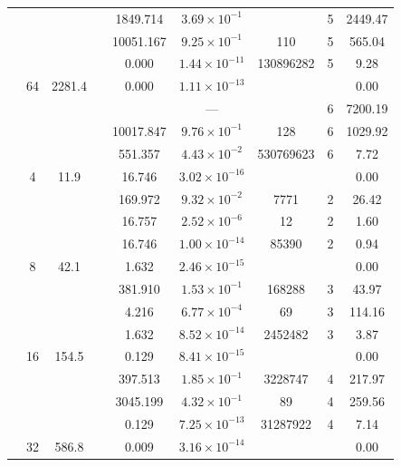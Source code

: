 \begin{table}[htbp]
\begin{tabular}{l S[table-format=3.0] S[table-format=4.1] l S[table-format=3.3] S[table-format=1.2e2] S[table-format=6.0] S[table-format=2.0] S[table-format=4.2]}
     &  &  &  & 1849.714 & $3.69 \times 10^{-1}$ & {\text{---}} & 5 & 2449.47 \\
     &  &  &  & 10051.167 & $9.25 \times 10^{-1}$ & 110 & 5 & 565.04 \\
     &  &  &  & 0.000 & $1.44 \times 10^{-11}$ & 130896282 & 5 & 9.28 \\
     & 64 & 2281.4 &  & 0.000 & $1.11 \times 10^{-13}$ & {\text{---}} & {\text{---}} & 0.00 \\
     &  &  &  & {\text{---}} & ${\text{---}}$ & {\text{---}} & 6 & 7200.19 \\
     &  &  &  & 10017.847 & $9.76 \times 10^{-1}$ & 128 & 6 & 1029.92 \\
     &  &  &  & 551.357 & $4.43 \times 10^{-2}$ & 530769623 & 6 & 7.72 \\
    \midrule
     & 4 & 11.9 &  & 16.746 & $3.02 \times 10^{-16}$ & {\text{---}} & {\text{---}} & 0.00 \\
     &  &  &  & 169.972 & $9.32 \times 10^{-2}$ & 7771 & 2 & 26.42 \\
     &  &  &  & 16.757 & $2.52 \times 10^{-6}$ & 12 & 2 & 1.60 \\
     &  &  &  & 16.746 & $1.00 \times 10^{-14}$ & 85390 & 2 & 0.94 \\
     & 8 & 42.1 &  & 1.632 & $2.46 \times 10^{-15}$ & {\text{---}} & {\text{---}} & 0.00 \\
     &  &  &  & 381.910 & $1.53 \times 10^{-1}$ & 168288 & 3 & 43.97 \\
     &  &  &  & 4.216 & $6.77 \times 10^{-4}$ & 69 & 3 & 114.16 \\
     &  &  &  & 1.632 & $8.52 \times 10^{-14}$ & 2452482 & 3 & 3.87 \\
     & 16 & 154.5 &  & 0.129 & $8.41 \times 10^{-15}$ & {\text{---}} & {\text{---}} & 0.00 \\
     &  &  &  & 397.513 & $1.85 \times 10^{-1}$ & 3228747 & 4 & 217.97 \\
     &  &  &  & 3045.199 & $4.32 \times 10^{-1}$ & 89 & 4 & 259.56 \\
     &  &  &  & 0.129 & $7.25 \times 10^{-13}$ & 31287922 & 4 & 7.14 \\
     & 32 & 586.8 &  & 0.009 & $3.16 \times 10^{-14}$ & {\text{---}} & {\text{---}} & 0.00 \\

\end{tabular}
\end{table}
